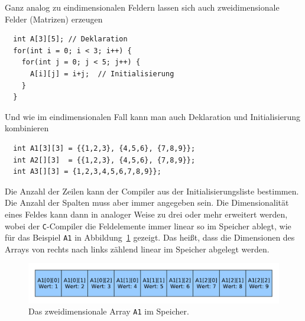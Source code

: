 Ganz analog zu eindimensionalen Feldern lassen sich auch zweidimensionale Felder (Matrizen) erzeugen
\begin{lstlisting}
  int A[3][5]; // Deklaration
  for(int i = 0; i < 3; i++) {
    for(int j = 0; j < 5; j++) {
      A[i][j] = i+j;  // Initialisierung
    }
  }
\end{lstlisting}
Und wie im eindimensionalen Fall kann man auch Deklaration und Initialisierung kombinieren
\begin{lstlisting}
  int A1[3][3] = {{1,2,3}, {4,5,6}, {7,8,9}};
  int A2[][3]  = {{1,2,3}, {4,5,6}, {7,8,9}};
  int A3[][3] = {1,2,3,4,5,6,7,8,9}};
\end{lstlisting}
Die Anzahl der Zeilen kann der Compiler aus der Initialisierungsliste bestimmen.
Die Anzahl der Spalten muss aber immer angegeben sein.
Die Dimensionalität eines Feldes kann dann in analoger Weise zu drei oder mehr erweitert werden, wobei der \texttt{C}-Compiler die Feldelemente immer linear so im Speicher ablegt, wie für das Beispiel \texttt{A1} in Abbildung~\ref{fig:2darray} gezeigt.
Das heißt, dass die Dimensionen des Arrays von rechts nach links zählend linear im Speicher abgelegt werden.

\begin{figure}[!ht]
  \includegraphics[width=\textwidth]{graphics/2darray_im_speicher}
  \caption{\label{fig:2darray} Das zweidimensionale Array \texttt{A1} im Speicher.}
\end{figure}

